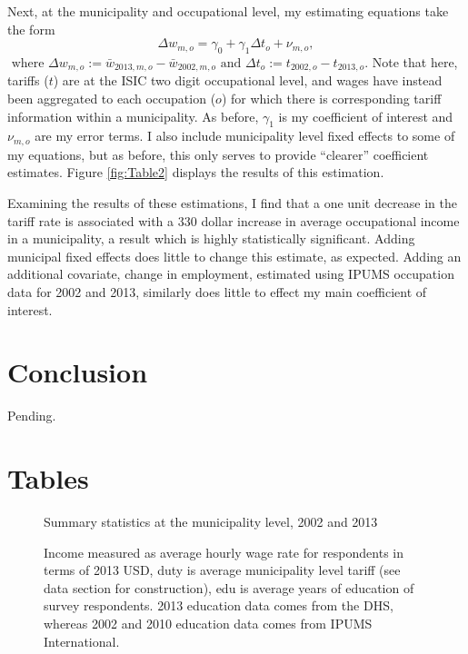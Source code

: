 \documentclass[12pt]{article}
\begin{document}
Next, at the municipality and occupational level, my estimating equations take the form
\begin{equation}
\Delta w_{m,o} = \gamma_0 + \gamma_1 \Delta t_o + \nu_{m,o},
\end{equation}
$\text{~where~}
\Delta w_{m,o} := \bar{w}_{2013,m,o} - \bar{w}_{2002,m,o} \text{~and~} 
\Delta t_o := t_{2002,o}-t_{2013,o}$.
Note that here, tariffs ($t$) are at the ISIC two digit occupational level, and wages 
have instead been aggregated to each occupation ($o$) for which there is
corresponding tariff information within a municipality. As before, $\gamma_1$ is
my coefficient of interest and $\nu_{m,o}$ are my error terms.
I also include municipality level fixed effects to some of my equations, but
as before, this only serves to provide ``clearer'' coefficient estimates.
Figure \ref{fig:Table2} displays the results of this estimation.

Examining the results of these estimations, I find that a one unit 
decrease in the tariff rate is associated with a 330 dollar increase 
in average occupational income in a municipality, a result which is
highly statistically significant. Adding municipal
fixed effects does little to change this estimate, as expected.
Adding an additional covariate, change in employment, estimated
using IPUMS occupation data for 2002 and 2013, similarly does
little to effect my main coefficient of interest.

\vspace{-10pt}
\section{Conclusion}
\label{sec:Conclusion}
Pending.

\newpage
\singlespacing



\newpage
\appendix
\singlespacing

\section{Tables}
\label{sec:Tables}
\fontsize{10pt}{12pt}\selectfont

\begin{figure}[H]
\begin{center}
Summary statistics at the municipality level, 2002 and 2013

\caption{\label{fig:Summary 1}}
\end{center}
Income measured
as average hourly wage rate for respondents in terms of 2013 USD, 
duty is average municipality level tariff (see data
section for construction), edu is average years of education of survey respondents. 
2013 education data comes from the DHS, whereas 2002 and 2010 education data comes
from IPUMS International.
\end{figure}
\end{document}
